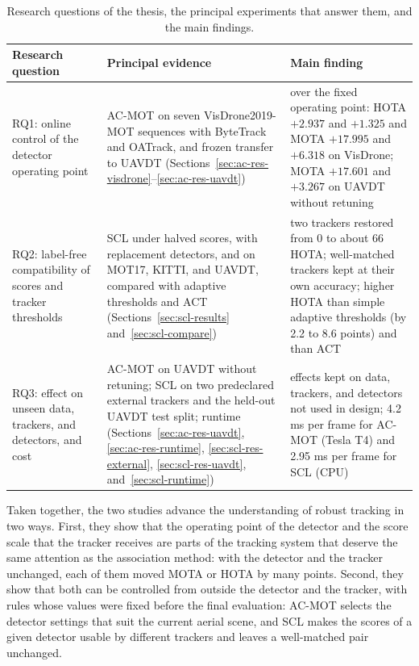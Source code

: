 \begin{table}[tbp]
\centering
\caption{Research questions of the thesis, the principal experiments that answer them, and the main findings.}
\label{tab:conc-rq}
\begin{tabular}{>{\raggedright\arraybackslash}p{2.9cm}>{\raggedright\arraybackslash}p{5.3cm}>{\raggedright\arraybackslash}p{5.7cm}}
\toprule
Research question & Principal evidence & Main finding\\
\midrule
RQ1: online control of the detector operating point & AC-MOT on seven VisDrone2019-MOT sequences with ByteTrack and OATrack, and frozen transfer to UAVDT (Sections~\ref{sec:ac-res-visdrone}--\ref{sec:ac-res-uavdt}) & over the fixed operating point: HOTA $+2.937$ and $+1.325$ and MOTA $+17.995$ and $+6.318$ on VisDrone; MOTA $+17.601$ and $+3.267$ on UAVDT without retuning\\
RQ2: label-free compatibility of scores and tracker thresholds & SCL under halved scores, with replacement detectors, and on MOT17, KITTI, and UAVDT, compared with adaptive thresholds and ACT (Sections~\ref{sec:scl-results} and~\ref{sec:scl-compare}) & two trackers restored from 0 to about 66 HOTA; well-matched trackers kept at their own accuracy; higher HOTA than simple adaptive thresholds (by 2.2 to 8.6 points) and than ACT\\
RQ3: effect on unseen data, trackers, and detectors, and cost & AC-MOT on UAVDT without retuning; SCL on two predeclared external trackers and the held-out UAVDT test split; runtime (Sections~\ref{sec:ac-res-uavdt}, \ref{sec:ac-res-runtime}, \ref{sec:scl-res-external}, \ref{sec:scl-res-uavdt}, and~\ref{sec:scl-runtime}) & effects kept on data, trackers, and detectors not used in design; 4.2 ms per frame for AC-MOT (Tesla T4) and 2.95 ms per frame for SCL (CPU)\\
\bottomrule
\end{tabular}
\end{table}

Taken together, the two studies advance the understanding of robust tracking in two ways. First, they show that the operating point of the detector and the score scale that the tracker receives are parts of the tracking system that deserve the same attention as the association method: with the detector and the tracker unchanged, each of them moved MOTA or HOTA by many points. Second, they show that both can be controlled from outside the detector and the tracker, with rules whose values were fixed before the final evaluation: AC-MOT selects the detector settings that suit the current aerial scene, and SCL makes the scores of a given detector usable by different trackers and leaves a well-matched pair unchanged.

